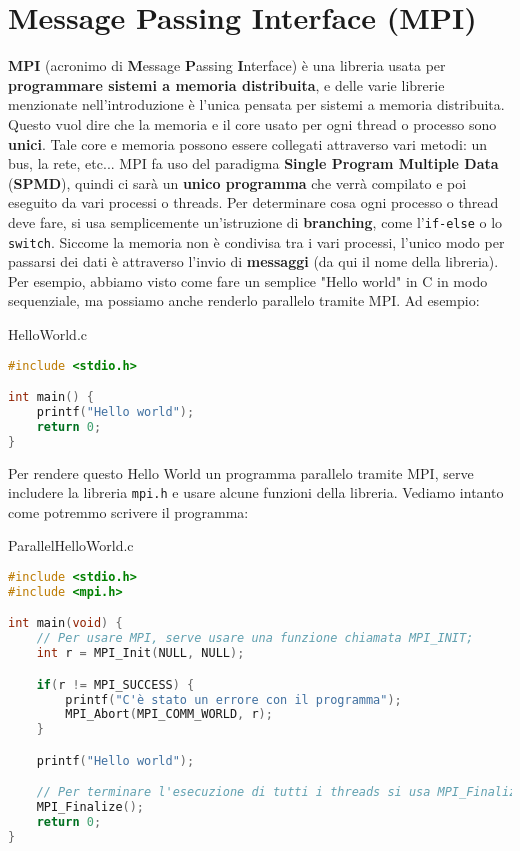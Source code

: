 \chapter{Message Passing Interface (MPI)}
\textbf{MPI} (acronimo di \textbf{M}essage \textbf{P}assing \textbf{I}nterface) è una libreria usata per \textbf{programmare sistemi a memoria distribuita}, e delle varie librerie menzionate nell'introduzione è l'unica pensata per sistemi a memoria distribuita. Questo vuol dire che la memoria e il core usato per ogni thread o processo sono \textbf{unici}. Tale core e memoria possono essere collegati attraverso vari metodi: un bus, la rete, etc...
\nl
MPI fa uso del paradigma \textbf{Single Program Multiple Data} (\textbf{SPMD}), quindi ci sarà un \textbf{unico programma} che verrà compilato e poi eseguito da vari processi o threads. Per determinare cosa ogni processo o thread deve fare, si usa semplicemente un'istruzione di \textbf{branching}, come l'\texttt{if-else} o lo \texttt{switch}.
\nl
Siccome la memoria non è condivisa tra i vari processi, l'unico modo per passarsi dei dati è attraverso l'invio di \textbf{messaggi} (da qui il nome della libreria). Per esempio, abbiamo visto come fare un semplice "Hello world" in C in modo sequenziale, ma possiamo anche renderlo parallelo tramite MPI. Ad esempio:
\begin{codeblock}{HelloWorld.c}
    \begin{lstlisting}[language = C]
#include <stdio.h>

int main() {
    printf("Hello world");
    return 0;
}\end{lstlisting}
\end{codeblock}
Per rendere questo Hello World un programma parallelo tramite MPI, serve includere la libreria \texttt{mpi.h} e usare alcune funzioni della libreria. Vediamo intanto come potremmo scrivere il programma:

\begin{codeblock}{ParallelHelloWorld.c}
    \begin{lstlisting}[language = C]
#include <stdio.h>
#include <mpi.h>

int main(void) {
    // Per usare MPI, serve usare una funzione chiamata MPI_INIT;
    int r = MPI_Init(NULL, NULL);

    if(r != MPI_SUCCESS) {
        printf("C'è stato un errore con il programma");
        MPI_Abort(MPI_COMM_WORLD, r);
    }

    printf("Hello world");

    // Per terminare l'esecuzione di tutti i threads si usa MPI_Finalize
    MPI_Finalize();
    return 0;
}\end{lstlisting}
\end{codeblock}

